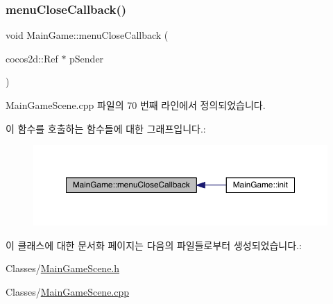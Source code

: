 \subsubsection{\texorpdfstring{menu\+Close\+Callback()}{menuCloseCallback()}}
{\footnotesize\ttfamily void Main\+Game\+::menu\+Close\+Callback (\begin{DoxyParamCaption}\item[{cocos2d\+::\+Ref $\ast$}]{p\+Sender }\end{DoxyParamCaption})}



Main\+Game\+Scene.\+cpp 파일의 70 번째 라인에서 정의되었습니다.

이 함수를 호출하는 함수들에 대한 그래프입니다.\+:
\nopagebreak
\begin{figure}[H]
\begin{center}
\leavevmode
\includegraphics[width=350pt]{class_main_game_a824206defd2b5af2359c3699aa55e289_icgraph}
\end{center}
\end{figure}


이 클래스에 대한 문서화 페이지는 다음의 파일들로부터 생성되었습니다.\+:\begin{DoxyCompactItemize}
\item 
Classes/\hyperlink{_main_game_scene_8h}{Main\+Game\+Scene.\+h}\item 
Classes/\hyperlink{_main_game_scene_8cpp}{Main\+Game\+Scene.\+cpp}\end{DoxyCompactItemize}
